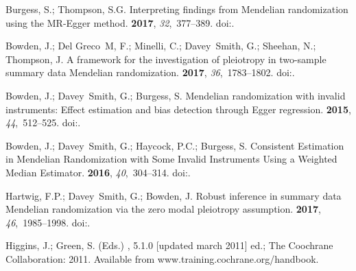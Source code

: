\documentclass[genes,article,accept,moreauthors,pdftex]{Definitions/mdpi}
\begin{document}
\begin{thebibliography}{999}
Burgess, S.; Thompson, S.G.
\newblock Interpreting findings from {Mendelian} randomization using the
  {MR}-{Egger} method.
 {\bf 2017}, {\em
  32},~377--389.
\newblock
  doi:{\href{https://doi.org/10.1007/s10654-017-0255-x}{}}.

Bowden, J.; Del Greco~M, F.; Minelli, C.; Davey~Smith, G.; Sheehan, N.;
  Thompson, J.
\newblock A framework for the investigation of pleiotropy in two-sample summary
  data {Mendelian} randomization.
 {\bf 2017}, {\em 36},~1783--1802.
\newblock
  doi:{\href{https://doi.org/10.1002/sim.7221}{}}.

Bowden, J.; Davey~Smith, G.; Burgess, S.
\newblock Mendelian randomization with invalid instruments: Effect estimation
  and bias detection through {Egger} regression.
 {\bf 2015}, {\em
  44},~512--525.
\newblock
  doi:{\href{https://doi.org/10.1093/ije/dyv080}{}}.

Bowden, J.; Davey~Smith, G.; Haycock, P.C.; Burgess, S.
\newblock Consistent {Estimation} in {Mendelian} {Randomization} with {Some}
  {Invalid} {Instruments} {Using} a {Weighted} {Median} {Estimator}.
 {\bf 2016}, {\em 40},~304--314.
\newblock
  doi:{\href{https://doi.org/10.1002/gepi.21965}{}}.

Hartwig, F.P.; Davey~Smith, G.; Bowden, J.
\newblock Robust inference in summary data {Mendelian} randomization via the
  zero modal pleiotropy assumption.
 {\bf 2017}, {\em
  46},~1985--1998.
\newblock
  doi:{\href{https://doi.org/10.1093/ije/dyx102}{}}.

Higgins, J.; Green, S. (Eds.)
, {5.1.0 [updated march 2011] ed.}; {The Coochrane
  Collaboration:}  2011. Available from www.training.cochrane.org/handbook. 


\end{thebibliography}
\end{document}
